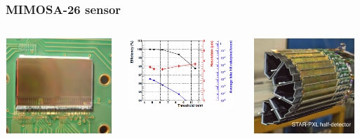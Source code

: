 \documentclass{beamer}
\begin{document}
\begin{frame}
  \frametitle{MIMOSA-26 sensor}

  \vspace{-0.5cm}
  \begin{columns}[c]
    \begin{column}{4cm}
      \begin{center}
        \includegraphics[width = 4.0cm,height=3.6cm]{Pictures/mi26.jpg}
      \end{center}
    \end{column}

    \begin{column}{4cm}
      \vspace{-0.3cm}
      \begin{center}
        \includegraphics[width = 4cm]{Pictures/MIMOSA26_chip26_HR15_20deg.png}

      \end{center}
    \end{column}
    \begin{column}{4cm}
      \begin{center}
        \includegraphics[width = 4.0cm, height=3.6cm]{Pictures/pxlFinal_sideView_smallSize.jpg}
      \end{center}
    \end{column}
  \end{columns}


\end{frame}
\end{document}
